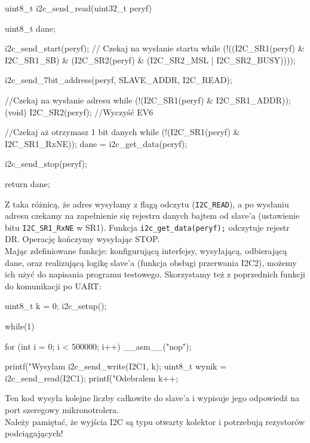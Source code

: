 \documentclass{pdfBooklets}
\begin{document}
\begin{CodeFrame*}[c]{}
uint8_t i2c_send_read(uint32_t peryf){
  uint8_t dane;
  
  i2c_send_start(peryf);
  // Czekaj na wysłanie startu
  while (!((I2C_SR1(peryf) & I2C_SR1_SB)
	   & (I2C_SR2(peryf) & (I2C_SR2_MSL | I2C_SR2_BUSY))));
  
  i2c_send_7bit_address(peryf, SLAVE_ADDR, I2C_READ);

  //Czekaj na wysłanie adresu
  while (!(I2C_SR1(peryf) & I2C_SR1_ADDR));
  (void) I2C_SR2(peryf); //Wyczyść EV6

  //Czekaj aż otrzymasz 1 bit danych
  while (!(I2C_SR1(peryf) & I2C_SR1_RxNE));
  dane = i2c_get_data(peryf);
  
 
  i2c_send_stop(peryf);

  return dane;
}
\end{CodeFrame*}

Z taka różnicą, że adres wysyłamy z flagą odczytu (\Verb$I2C_READ$), a po wysłaniu adresu czekamy na zapełnienie się rejestru danych bajtem od
slave'a (ustawienie bitu \Verb$I2C_SR1_RxNE$ w SR1). Funkcja \Verb$i2c_get_data(peryf);$ odczytuje rejestr DR. Operację kończymy wysyłając STOP. \\

Mając zdefiniowane funkcje: konfigurującą interfejsy, wysyłającą, odbierającą dane, oraz realizującą logikę slave'a (funkcja obsługi przerwania I2C2),
możemy ich użyć do napisania programu testowego. Skorzystamy też z poprzednich funkcji do komunikacji po UART:

\begin{CodeFrame*}[c]{}
  uint8_t k = 0;
  i2c_setup();

  while(1){
    for (int i = 0; i < 500000; i++) __asm__("nop");
    
    printf("Wysylam %
    i2c_send_write(I2C1, k);    
    uint8_t wynik = i2c_send_read(I2C1);
    printf("Odebralem %
    k++;
  }
\end{CodeFrame*}

Ten kod wysyła kolejne liczby całkowite do slave'a i wypisuje jego odpowiedź na port szeregowy mikronotrolera.\\

Należy pamiętać, że wyjścia I2C są typu otwarty kolektor i potrzebują rezystorów podciągających!

\end{document}
